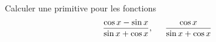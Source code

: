 Calculer une primitive pour les fonctions
\begin{displaymath}
 \frac{\cos x - \sin x}{\sin x + \cos x},
\hspace{0.5cm}
 \frac{\cos x}{\sin x + \cos x}
\end{displaymath}
\bigskip \bigskip